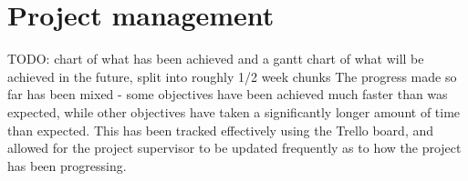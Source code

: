 \section{Project management}
TODO: chart of what has been achieved and a gantt chart of what will be achieved in the future, split into roughly 1/2 week chunks
The progress made so far has been mixed - some objectives have been achieved much faster than was expected, while other objectives have taken a significantly longer amount of time than expected. This has been tracked effectively using the Trello\cite{} board, and allowed for the project supervisor to be updated frequently as to how the project has been progressing.